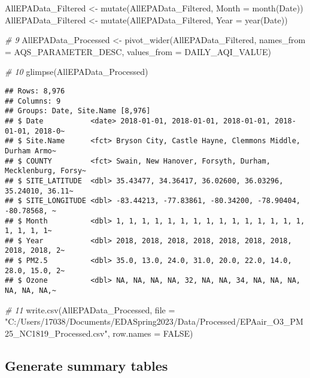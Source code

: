 \documentclass[
]{article}
\newenvironment{Shaded}{\begin{snugshade}}{\end{snugshade}}
\newcommand{\AttributeTok}[1]{\textcolor[rgb]{0.77,0.63,0.00}{#1}}
\newcommand{\CommentTok}[1]{\textcolor[rgb]{0.56,0.35,0.01}{\textit{#1}}}
\newcommand{\ConstantTok}[1]{\textcolor[rgb]{0.00,0.00,0.00}{#1}}
\newcommand{\FunctionTok}[1]{\textcolor[rgb]{0.00,0.00,0.00}{#1}}
\newcommand{\NormalTok}[1]{#1}
\newcommand{\OtherTok}[1]{\textcolor[rgb]{0.56,0.35,0.01}{#1}}
\newcommand{\StringTok}[1]{\textcolor[rgb]{0.31,0.60,0.02}{#1}}
\begin{document}
\begin{Shaded}
\begin{Highlighting}[]
\NormalTok{AllEPAData\_Filtered }\OtherTok{\textless{}{-}} \FunctionTok{mutate}\NormalTok{(AllEPAData\_Filtered, }\AttributeTok{Month =} \FunctionTok{month}\NormalTok{(Date))}
\NormalTok{AllEPAData\_Filtered }\OtherTok{\textless{}{-}} \FunctionTok{mutate}\NormalTok{(AllEPAData\_Filtered, }\AttributeTok{Year =} \FunctionTok{year}\NormalTok{(Date))}

\CommentTok{\# 9}
\NormalTok{AllEPAData\_Processed }\OtherTok{\textless{}{-}} \FunctionTok{pivot\_wider}\NormalTok{(AllEPAData\_Filtered, }\AttributeTok{names\_from =}\NormalTok{ AQS\_PARAMETER\_DESC,}
    \AttributeTok{values\_from =}\NormalTok{ DAILY\_AQI\_VALUE)}

\CommentTok{\# 10}
\FunctionTok{glimpse}\NormalTok{(AllEPAData\_Processed)}
\end{Highlighting}
\end{Shaded}

\begin{verbatim}
## Rows: 8,976
## Columns: 9
## Groups: Date, Site.Name [8,976]
## $ Date           <date> 2018-01-01, 2018-01-01, 2018-01-01, 2018-01-01, 2018-0~
## $ Site.Name      <fct> Bryson City, Castle Hayne, Clemmons Middle, Durham Armo~
## $ COUNTY         <fct> Swain, New Hanover, Forsyth, Durham, Mecklenburg, Forsy~
## $ SITE_LATITUDE  <dbl> 35.43477, 34.36417, 36.02600, 36.03296, 35.24010, 36.11~
## $ SITE_LONGITUDE <dbl> -83.44213, -77.83861, -80.34200, -78.90404, -80.78568, ~
## $ Month          <dbl> 1, 1, 1, 1, 1, 1, 1, 1, 1, 1, 1, 1, 1, 1, 1, 1, 1, 1, 1~
## $ Year           <dbl> 2018, 2018, 2018, 2018, 2018, 2018, 2018, 2018, 2018, 2~
## $ PM2.5          <dbl> 35.0, 13.0, 24.0, 31.0, 20.0, 22.0, 14.0, 28.0, 15.0, 2~
## $ Ozone          <dbl> NA, NA, NA, NA, 32, NA, NA, 34, NA, NA, NA, NA, NA, NA,~
\end{verbatim}

\begin{Shaded}
\begin{Highlighting}[]
\CommentTok{\# 11}
\FunctionTok{write.csv}\NormalTok{(AllEPAData\_Processed, }\AttributeTok{file =} \StringTok{"C:/Users/17038/Documents/EDASpring2023/Data/Processed/EPAair\_O3\_PM25\_NC1819\_Processed.csv"}\NormalTok{,}
    \AttributeTok{row.names =} \ConstantTok{FALSE}\NormalTok{)}
\end{Highlighting}
\end{Shaded}

\hypertarget{generate-summary-tables}{%
\subsection{Generate summary tables}\label{generate-summary-tables}}
\end{document}
